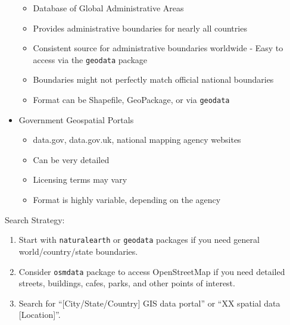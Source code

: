 \documentclass[
]{article}
\providecommand{\tightlist}{%
  \setlength{\itemsep}{0pt}\setlength{\parskip}{0pt}}
\begin{document}
\begin{itemize}
  \begin{itemize}
  \tightlist
  \item
    Database of Global Administrative Areas\\
  \item
    Provides administrative boundaries for nearly all countries\\
  \item
    Consistent source for administrative boundaries worldwide - Easy to
    access via the \texttt{geodata} package\\
  \item
    Boundaries might not perfectly match official national boundaries\\
  \item
    Format can be Shapefile, GeoPackage, or via \texttt{geodata}\\
  \end{itemize}
\item
  Government Geospatial Portals\\

  \begin{itemize}
  \tightlist
  \item
    data.gov, data.gov.uk, national mapping agency websites\\
  \item
    Can be very detailed\\
  \item
    Licensing terms may vary\\
  \item
    Format is highly variable, depending on the agency
  \end{itemize}
\end{itemize}

Search Strategy:

\begin{enumerate}
\def\labelenumi{\arabic{enumi}.}
\tightlist
\item
  Start with \texttt{naturalearth} or \texttt{geodata} packages if you
  need general world/country/state boundaries.\\
\item
  Consider \texttt{osmdata} package to access OpenStreetMap if you need
  detailed streets, buildings, cafes, parks, and other points of
  interest.\\
\item
  Search for ``{[}City/State/Country{]} GIS data portal'' or ``XX
  spatial data {[}Location{]}''.
\end{enumerate}
\end{document}
